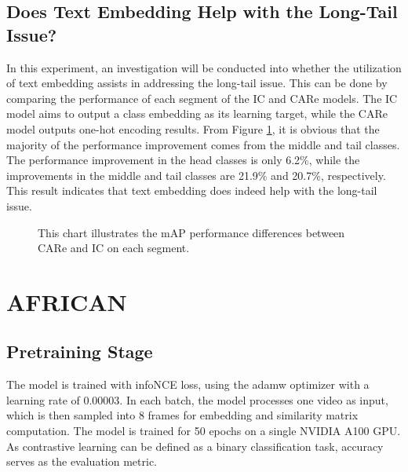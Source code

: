 \subsection{Does Text Embedding Help with the Long-Tail Issue?}
In this experiment, an investigation will be conducted into whether the utilization of text embedding assists in addressing the long-tail issue. This can be done by comparing the performance of each segment of the IC and CARe models. The IC model aims to output a class embedding as its learning target, while the CARe model outputs one-hot encoding results. From Figure \ref{fig:tp_longtailcomp}, it is obvious that the majority of the performance improvement comes from the middle and tail classes. The performance improvement in the head classes is only 6.2\%, while the improvements in the middle and tail classes are 21.9\% and 20.7\%, respectively. This result indicates that text embedding does indeed help with the long-tail issue. 

\begin{figure}[ht]
    \centering
    \resizebox{1.0\textwidth}{!}{}
    \caption[mAP Performance Differences between CARe and IC on each Segment]{This chart illustrates the mAP performance differences between CARe and IC on each segment.}
    \label{fig:tp_longtailcomp}
\end{figure}



\section{AFRICAN}
\subsection{Pretraining Stage}
The model is trained with infoNCE \parencite{oord2019representation} loss, using the adamw optimizer with a learning rate of 0.00003. In each batch, the model processes one video as input, which is then sampled into 8 frames for embedding and similarity matrix computation. The model is trained for 50 epochs on a single NVIDIA A100 GPU. As contrastive learning can be defined as a binary classification task, accuracy serves as the evaluation metric.

